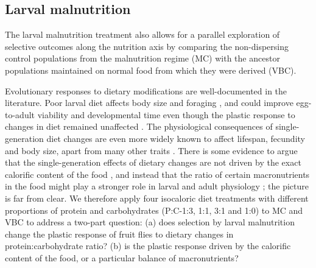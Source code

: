 \documentclass[12pt,onecolumn,twoside]{article}
\begin{document}
	\subsection{Larval malnutrition}

	The larval malnutrition treatment also allows for a parallel exploration of selective outcomes along the nutrition axis by comparing the non-dispersing control populations from the malnutrition regime (MC) with the ancestor populations maintained on normal food from which they were derived (VBC).

	Evolutionary responses to dietary modifications are well-documented in the literature. Poor larval diet affects body size and foraging \citep{Ahmad2018, Vijendravarma2012}, and could improve egg-to-adult viability and developmental time even though the plastic response to changes in diet remained unaffected \citep{Kolss2009}. The physiological consequences of single-generation diet changes are even more widely known to affect lifespan, fecundity and body size, apart from many other traits \citep{Lee2008, Tatar2014, Musselman2011, Skorupa2008}. There is some evidence to argue that the single-generation effects of dietary changes are not driven by the exact calorific content of the food \citep{Mair2005}, and instead that the ratio of certain macronutrients in the food might play a stronger role in larval and adult physiology \citep{Tatar2014, Lihoreau2016}; the picture is far from clear. We therefore apply four isocaloric diet treatments with different proportions of protein and carbohydrates (P:C-1:3, 1:1, 3:1 and 1:0) to MC and VBC to address a two-part question: (a) does selection by larval malnutrition change the plastic response of fruit flies to dietary changes in protein:carbohydrate ratio? (b) is the plastic response driven by the calorific content of the food, or a particular balance of macronutrients?
\end{document}
